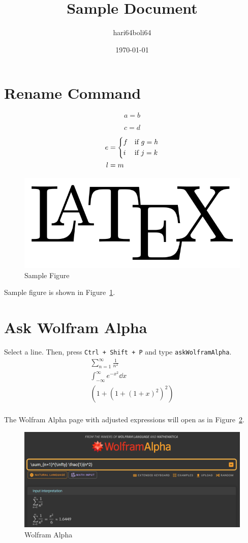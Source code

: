 \documentclass[a4paper, 10pt]{article}
\begin{document}
\title{Sample Document}
\author{hari64boli64}
\date{\today}
\maketitle

\section{Rename Command}

\begin{equation}\label{eq:1}
    a = b
\end{equation}

\begin{equation*}
    c = d
\end{equation*}

\begin{align}
    e & = \begin{dcases}
              f & \text{if } g = h \\
              i & \text{if } j = k
          \end{dcases} \\
    l & = m \notag
\end{align}

\begin{figure}[h] %
    \centering
    \includegraphics[width=0.5\columnwidth]{../images/sample.png}
    \caption{Sample Figure}
    \label{fig:1}
\end{figure}

Sample figure is shown in Figure~\ref{fig:1}.

\section{Ask Wolfram Alpha}

Select a line. Then, press \texttt{Ctrl + Shift + P} and type \texttt{askWolframAlpha}.
\begin{gather*}
    \sum_{n=1}^{\infty} \frac{1}{n^2} \\
    \int_{-\infty}^{\infty} e^{-x^2} \dd x \\
    \left(1+\left(1+\left(1+x\right)^2\right)^2\right) \\
\end{gather*}

The Wolfram Alpha page with adjusted expressions will open as in Figure~\ref{fig:2}.
\begin{figure}[htbp]
    \centering
    \includegraphics[width=\columnwidth]{../images/WolframAlpha.png}
    \caption{Wolfram Alpha}
    \label{fig:2}
\end{figure}
\end{document}
